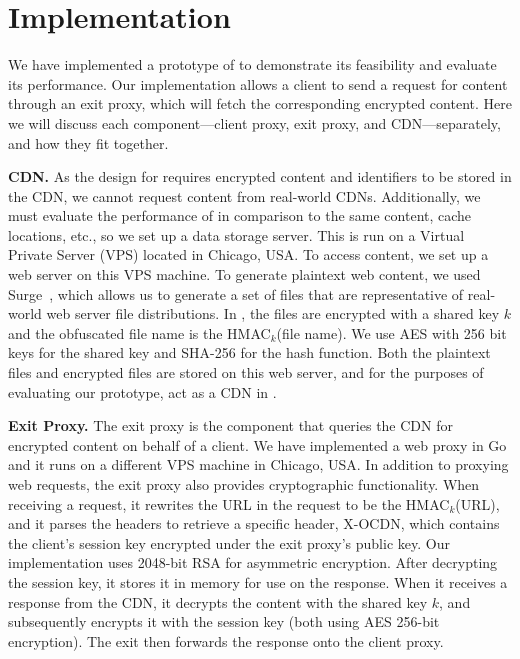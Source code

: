 \section{Implementation}
\label{sec:implementation}

We have implemented a prototype of \system{} to demonstrate its feasibility and 
evaluate its performance.  Our implementation allows a client to send a request 
for content through an exit proxy, which will fetch the corresponding 
encrypted content.  Here we will discuss each component---client proxy, exit proxy, 
and CDN---separately, and how they fit together.

{\bf CDN.} As the design for \system{} requires encrypted content and identifiers 
to be stored in the CDN, we cannot request content from real-world CDNs.  Additionally, 
we must evaluate the performance of \system{} in comparison to the same content, cache locations, etc., so 
we set up a data storage server.  This is run on a Virtual Private Server (VPS) located in 
Chicago, USA.  To access content, we set up a web server on this VPS machine.  To generate 
plaintext web content, we used Surge~\cite{barford1998generating}, which allows us 
to generate a set of files that are representative of real-world web server file distributions.  
In \system{}, the files are encrypted with a shared key $k$ and the obfuscated file name is the 
HMAC$_{k}$(file name).  We use AES with 256 bit keys for the shared key and SHA-256 for the 
hash function.  Both the plaintext files and encrypted files are stored on this web server, and 
for the purposes of evaluating our prototype, act as a CDN in \system{}.

{\bf Exit Proxy.} The exit proxy is the component that queries the CDN for encrypted 
content on behalf of a client.  We have implemented a web proxy in Go and it runs on 
a different VPS machine in Chicago, USA.  In addition to proxying web requests, the exit 
proxy also provides cryptographic functionality.  When receiving a request, it rewrites
the URL in the request to be the HMAC$_{k}$(URL), and it parses the headers to retrieve a 
specific header, X-OCDN, which contains the client's session key encrypted under the exit 
proxy's public key.  Our implementation uses 2048-bit RSA for asymmetric encryption.  After 
decrypting the session key, it stores it in memory for use on the response.  When 
it receives a response from the CDN, it decrypts the content with the shared key $k$, and 
subsequently encrypts it with the session key (both using AES 256-bit encryption).  The 
exit then forwards the response onto the client proxy.

